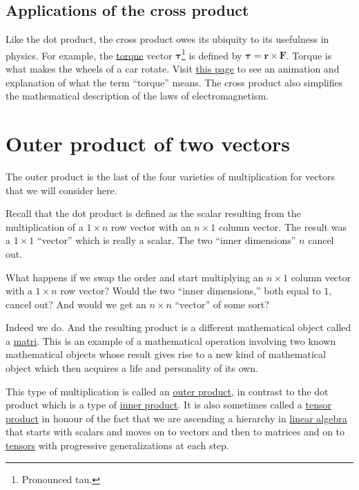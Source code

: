 \documentclass[
  a4paper,
]{article}
\begin{document}
\hypertarget{applications-of-the-cross-product}{%
\subsection{Applications of the cross
product}\label{applications-of-the-cross-product}}

Like the dot product, the cross product owes its ubiquity to its
usefulness in physics. For example, the
\href{https://en.wikipedia.org/wiki/Torque}{torque} vector
\(\symbf{\tau}\)\footnote{Pronounced tau.} is defined by
\(\symbf{\tau} = \symbf{r}\times\symbf{F}\). Torque is what makes the
wheels of a car rotate. Visit
\href{https://en.wikipedia.org/wiki/Torque}{this page} to see an
animation and explanation of what the term ``torque'' means. The cross
product also simplifies the mathematical description of the laws of
electromagnetism.

\hypertarget{outer-product-of-two-vectors}{%
\section{Outer product of two
vectors}\label{outer-product-of-two-vectors}}

The outer product is the last of the four varieties of multiplication
for vectors that we will consider here.

Recall that the dot product is defined as the scalar resulting from the
multiplication of a \(1\times n\) row vector with an \(n \times 1\)
column vector. The result was a \(1 \times 1\) ``vector'' which is
really a scalar. The two ``inner dimensions'' \(n\) cancel out.

What happens if we swap the order and start multiplying an
\(n \times 1\) column vector with a \(1\times n\) row vector? Would the
two ``inner dimensions,'' both equal to \(1\), cancel out? And would we
get an \(n \times n\) ``vector'' of some sort?

Indeed we do. And the resulting product is a different mathematical
object called a
\href{https://en.wikipedia.org/wiki/Matrix_\%28mathematics\%29}{matri}.
This is an example of a mathematical operation involving two known
mathematical objects whose result gives rise to a new kind of
mathematical object which then acquires a life and personality of its
own.

This type of multiplication is called an
\href{https://en.wikipedia.org/wiki/Outer_product}{outer product}, in
contrast to the dot product which is a type of
\href{https://planetmath.org/InnerProduct}{inner product}. It is also
sometimes called a
\href{https://en.wikipedia.org/wiki/Tensor_product}{tensor product} in
honour of the fact that we are ascending a hierarchy in
\href{https://en.wikipedia.org/wiki/Linear_algebra}{linear algebra} that
starts with scalars and moves on to vectors and then to matrices and on
to
\href{https://en.wikipedia.org/wiki/Tensor_\%28intrinsic_definition\%29}{tensors}
with progressive generalizations at each step.
\end{document}
